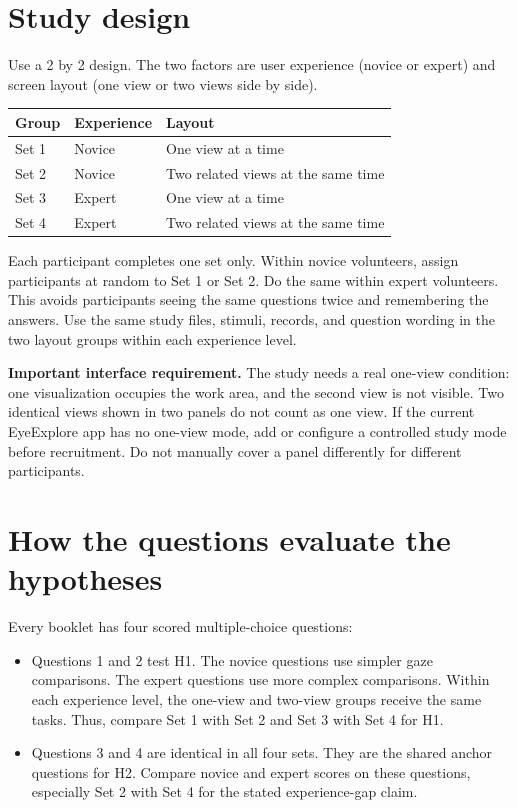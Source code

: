 \documentclass[11pt]{article}
\begin{document}
\section{Study design}
Use a 2 by 2 design. The two factors are user experience (novice or expert) and
screen layout (one view or two views side by side).

\begin{center}
\begin{tabular}{lll}
\toprule
Group & Experience & Layout \\
\midrule
Set 1 & Novice & One view at a time \\
Set 2 & Novice & Two related views at the same time \\
Set 3 & Expert & One view at a time \\
Set 4 & Expert & Two related views at the same time \\
\bottomrule
\end{tabular}
\end{center}

Each participant completes one set only. Within novice volunteers, assign
participants at random to Set 1 or Set 2. Do the same within expert
volunteers. This avoids participants seeing the same questions twice and
remembering the answers. Use the same study files, stimuli, records, and
question wording in the two layout groups within each experience level.

\textbf{Important interface requirement.} The study needs a real one-view
condition: one visualization occupies the work area, and the second view is
not visible. Two identical views shown in two panels do not count as one view.
If the current EyeExplore app has no one-view mode, add or configure a controlled
study mode before recruitment. Do not manually cover a panel differently for
different participants.

\section{How the questions evaluate the hypotheses}
Every booklet has four scored multiple-choice questions:

\begin{itemize}
  \item Questions 1 and 2 test H1. The novice questions use simpler gaze
  comparisons. The expert questions use more complex comparisons. Within each
  experience level, the one-view and two-view groups receive the same tasks.
  Thus, compare Set 1 with Set 2 and Set 3 with Set 4 for H1.
  \item Questions 3 and 4 are identical in all four sets. They are the shared
  anchor questions for H2. Compare novice and expert scores on these questions,
  especially Set 2 with Set 4 for the stated experience-gap claim.
\end{itemize}
\end{document}
